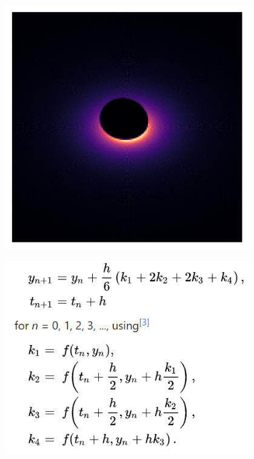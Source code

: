 \documentclass{beamer}
\begin{document}
\begin{frame}{}
    \centering

    \includegraphics[width=0.8\textwidth]{asset/bh_0.95_45.png}

\end{frame}


\begin{frame}{}
    \centering

    \includegraphics[width=0.8\textwidth]{asset/rk4.png}
\end{frame}
\end{document}
